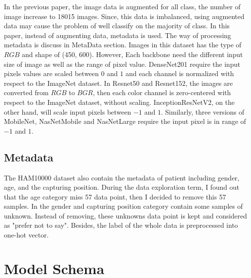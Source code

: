 In the previous paper\cite{03358}, the image data is augmented for all class, the number of image increase to 18015 images. Since, this data is imbalanced, using augmented data may cause the problem of well classify on the majority of class. In this paper, instead of augmenting data, metadata is used. The way of processing metadata is discuss in MetaData section. Images in this dataset has the type of $RGB$ and shape of (450, 600). However, Each backbone need the different input size of image as well as the range of pixel value. DenseNet201\cite{06993} require the input pixels values are scaled between $0$ and $1$ and each channel is normalized with respect to the ImageNet dataset. In Resnet50 and Resnet152\cite{03385}\cite{05027}, the images are converted from $RGB$ to $BGR$, then each color channel is zero-centered with respect to the ImageNet dataset, without scaling. InceptionResNetV2\cite{11946}, on the other hand, will scale input pixels between $-1$ and $1$. Similarly, three versions of MobileNet\cite{04861}\cite{04381}\cite{02244}, NasNetMobile and NasNetLarge\cite{07012} require the input pixel is in range of $-1$ and $1$. 
\subsection{Metadata}
The HAM10000 dataset\cite{10417} also contain the metadata of patient including gender, age, and the capturing position. During the data exploration term, I found out that the age category miss 57 data point, then I decided to remove this 57 samples. In the gender and capturing position category contain some samples of unknown. Instead of removing, these unknowns data point is kept and considered as "prefer not to say". Besides, the label of the whole data is preprocessed into one-hot vector.
\section{Model Schema}

